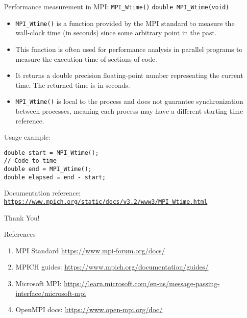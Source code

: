 \documentclass{beamer}
\begin{document}
\begin{frame}[fragile]{Performance measurement in MPI: \texttt{MPI\_Wtime()}}
  \texttt{double MPI\_Wtime(void)}

  \begin{itemize}
    \item \texttt{MPI\_Wtime()} is a function provided by the MPI standard to measure the wall-clock time (in seconds) since some arbitrary point in the past.
    \item This function is often used for performance analysis in parallel programs to measure the execution time of sections of code.
    \item It returns a double precision floating-point number representing the current time. The returned time is in seconds.
    \item \texttt{MPI\_Wtime()} is local to the process and does not guarantee synchronization between processes, meaning each process may have a different starting time reference.
  \end{itemize}

  Usage example:
  \lstset{style=CStyle}
  \begin{lstlisting}
double start = MPI_Wtime();
// Code to time
double end = MPI_Wtime();
double elapsed = end - start;
  \end{lstlisting}

  Documentation reference: \texttt{\href{https://www.mpich.org/static/docs/v3.2/www3/MPI_Wtime.html}{https://www.mpich.org/static/docs/v3.2/www3/MPI\_Wtime.html}}
\end{frame}


\begin{frame}
    \centering
    \Huge{Thank You!}
\end{frame}

\begin{frame}{References}
  \begin{enumerate}
    \item MPI Standard \href{https://www.mpi-forum.org/docs/}{https://www.mpi-forum.org/docs/}
    \item MPICH guides: \href{https://www.mpich.org/documentation/guides/}{https://www.mpich.org/documentation/guides/}
    \item Microsoft MPI: \href{https://learn.microsoft.com/en-us/message-passing-interface/microsoft-mpi}{https://learn.microsoft.com/en-us/message-passing-interface/microsoft-mpi}
    \item OpenMPI docs: \href{https://www.open-mpi.org/doc/}{https://www.open-mpi.org/doc/}
  \end{enumerate}
\end{frame}
\end{document}
